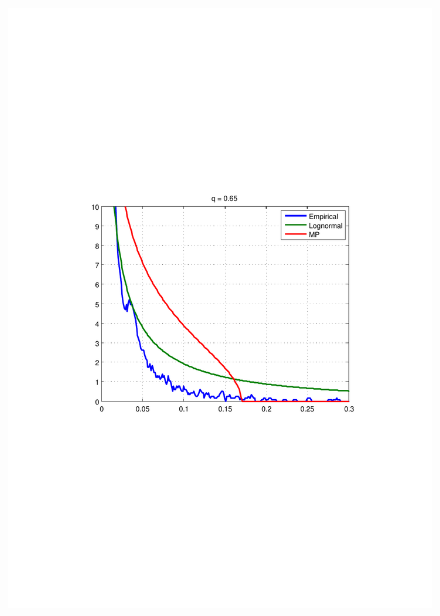 \documentclass{article}
\begin{document}
\begin{figure}[htb!]
{    \includegraphics[scale=0.4, clip=true, trim=115 271 109
    204]{../pics/spectral_density_q0dot65.pdf}
  }
  \subfigure[q = 0.8, KL=0.14]{
}
\end{figure}
\end{document}
